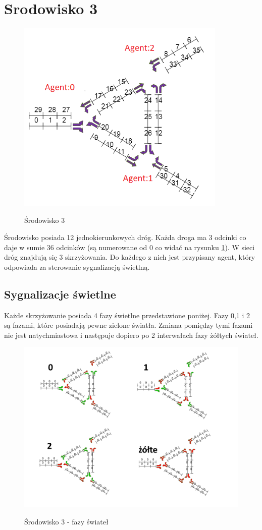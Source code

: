 \documentclass[12pt]{book}
\theoremstyle{plain}
\begin{document}
\section{Srodowisko 3}
\begin{figure}[H]
	\centering
	\includegraphics[width=10cm]{env_4_agenci}
	\label{fig:env_4_agenci}
	\caption{Środowisko 3}
\end{figure}

Środowisko posiada 12 jednokierunkowych dróg. Każda droga ma 3 odcinki co daje w sumie 36 odcinków (są numerowane od 0 co widać na rysunku \ref{fig:env_4_agenci}).
W sieci dróg znajdują się 3 skrzyżowania. Do każdego z nich jest przypisany agent, który odpowiada za sterowanie sygnalizacją świetlną.
\subsection{Sygnalizacje świetlne}
Każde skrzyżowanie posiada 4 fazy świetlne przedstawione poniżej. Fazy 0,1 i 2 są fazami, które posiadają pewne zielone światła. Zmiana pomiędzy tymi fazami nie jest natychmiastowa i następuje dopiero po 2 interwałach fazy żółtych świateł.
\begin{figure}[H]
	\centering
	\includegraphics[width=14cm]{env_4_fazy}
	\label{fig:env_4_fazy}
	\caption{Środowisko 3 - fazy świateł}
\end{figure}
\end{document}

